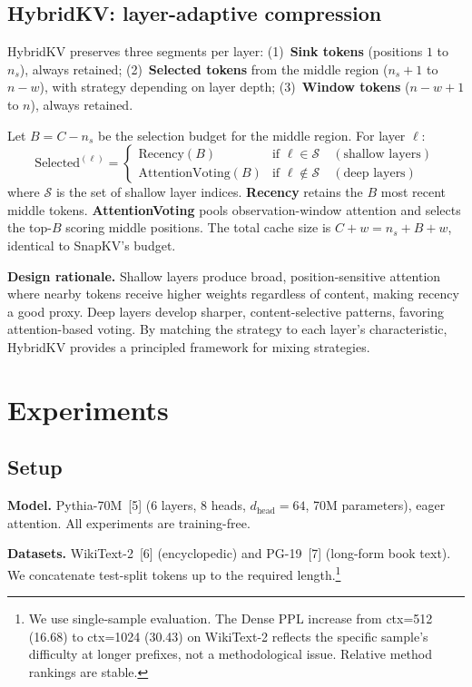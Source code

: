 \documentclass{article}
\begin{document}
\subsection{HybridKV: layer-adaptive compression}

HybridKV preserves three segments per layer: (1)~\textbf{Sink tokens} (positions $1$ to $n_s$), always retained; (2)~\textbf{Selected tokens} from the middle region ($n_s\!+\!1$ to $n\!-\!w$), with strategy depending on layer depth; (3)~\textbf{Window tokens} ($n\!-\!w\!+\!1$ to $n$), always retained.

Let $B = C - n_s$ be the selection budget for the middle region. For layer $\ell$:
\begin{equation}
    \text{Selected}^{(\ell)} =
    \begin{cases}
        \text{Recency}(B) & \text{if } \ell \in \mathcal{S} \quad (\text{shallow layers}) \\
        \text{AttentionVoting}(B) & \text{if } \ell \notin \mathcal{S} \quad (\text{deep layers})
    \end{cases}
\end{equation}
where $\mathcal{S}$ is the set of shallow layer indices. \textbf{Recency} retains the $B$ most recent middle tokens. \textbf{AttentionVoting} pools observation-window attention and selects the top-$B$ scoring middle positions. The total cache size is $C + w = n_s + B + w$, identical to SnapKV's budget.

\textbf{Design rationale.}
Shallow layers produce broad, position-sensitive attention where nearby tokens receive higher weights regardless of content, making recency a good proxy. Deep layers develop sharper, content-selective patterns, favoring attention-based voting. By matching the strategy to each layer's characteristic, HybridKV provides a principled framework for mixing strategies.

\section{Experiments}

\subsection{Setup}

\textbf{Model.} Pythia-70M~[5] (6 layers, 8 heads, $d_{\text{head}} = 64$, 70M parameters), eager attention. All experiments are training-free.

\textbf{Datasets.} WikiText-2~[6] (encyclopedic) and PG-19~[7] (long-form book text). We concatenate test-split tokens up to the required length.\footnote{We use single-sample evaluation. The Dense PPL increase from ctx=512 (16.68) to ctx=1024 (30.43) on WikiText-2 reflects the specific sample's difficulty at longer prefixes, not a methodological issue. Relative method rankings are stable.}
\end{document}
